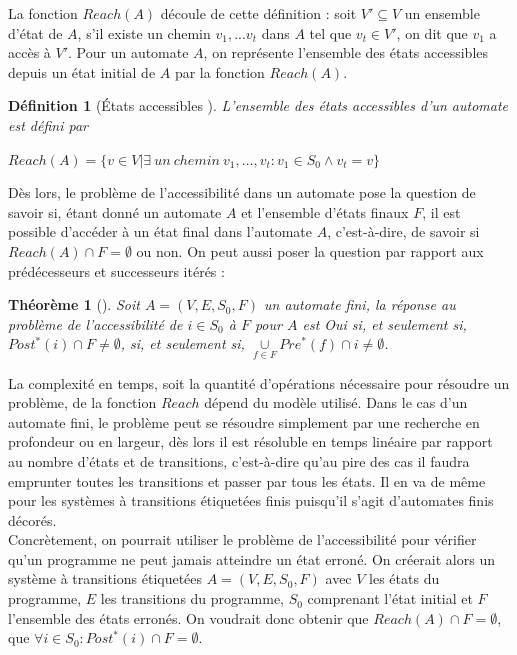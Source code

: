 \documentclass[11pt,a4paper,oneside]{book}
\theoremstyle{break}
\newtheorem{defin}{Définition}
\theoremstyle{breakplain}
\newtheorem{theo}{Théorème}
\begin{document}
La fonction $Reach(A)$ découle de cette définition : soit $V' \subseteq V$ un ensemble d'état de $A$, s'il existe un chemin $v_1,...v_t$ dans $A$ tel que $v_t \in V'$, on dit que $v_1$ a accès à $V'$. Pour un automate $A$, on représente l'ensemble des états accessibles depuis un état initial de $A$ par la fonction $Reach(A)$.

\begin{defin}[États accessibles \cite{geeraerts2013multiprocessor}]
L'ensemble des états accessibles d'un automate est défini par 
\begin{center}
$Reach(A) = \{v \in V | \exists\ un\ chemin\ v_1,...,v_t : v_1 \in S_0 \wedge v_t = v\}$
\end{center}
\end{defin}

Dès lors, le problème de l'accessibilité dans un automate pose la question de savoir si, étant donné un automate $A$ et l'ensemble d'états finaux $F$, il est possible d'accéder à un état final dans l'automate $A$, c'est-à-dire, de savoir si $Reach(A) \cap F = \emptyset$ ou non. On peut aussi poser la question par rapport aux prédécesseurs et successeurs itérés :

\begin{theo}[\cite{doyen2010antichain}]
Soit $A = (V,E,S_0,F)$ un automate fini, la réponse au problème de l'accessibilité de $i \in S_0$ à $F$ pour $A$ est Oui si, et seulement si, $Post^*(i) \cap F \neq \emptyset$, si, et seulement si, $\underset{f \in F}{\cup}Pre^*(f) \cap i \neq \emptyset$.
\end{theo}

La complexité en temps, soit la quantité d'opérations nécessaire pour résoudre un problème, de la fonction $Reach$ dépend du modèle utilisé. Dans le cas d'un automate fini, le problème peut se résoudre simplement par une recherche en profondeur ou en largeur, dès lors il est résoluble en temps linéaire par rapport au nombre d'états et de transitions, c'est-à-dire qu'au pire des cas il faudra emprunter toutes les transitions et passer par tous les états. Il en va de même pour les systèmes à transitions étiquetées finis puisqu'il s'agit d'automates finis décorés.\\

Concrètement, on pourrait utiliser le problème de l'accessibilité pour vérifier qu'un programme ne peut jamais atteindre un état erroné. On créerait alors un système à transitions étiquetées $A = (V, E, S_0, F)$ avec $V$ les états du programme, $E$ les transitions du programme, $S_0$ comprenant l'état initial et $F$ l'ensemble des états erronés. On voudrait donc obtenir que $Reach(A) \cap F = \emptyset$, que $\forall i \in S_0 : Post^*(i) \cap F = \emptyset$.
\end{document}

